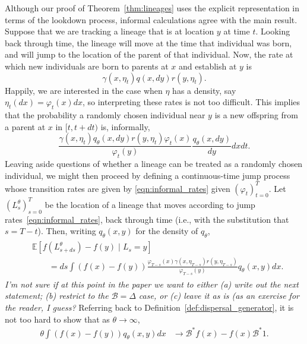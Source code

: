 \documentclass[12pt]{article}
\newcommand{\IE}{\mathbb E}
\newcommand{\DG}{\mathcal{B}}  %
\newcommand{\comment}[1]{{\color{blue} \it #1}}
\begin{document}
Although our proof of Theorem~\ref{thm:lineages}
uses the explicit representation in terms of the lookdown process,
informal calculations agree with the main result.
Suppose that we are tracking a lineage that is at location $y$ at time $t$.
Looking back through time, the lineage will move at the time that individual was born,
and will jump to the location of the parent of that individual.
Now, the rate at which new individuals are born to parents at $x$ and establish at $y$
is
$$
    \gamma(x, \eta_t) q(x, dy) r(y, \eta_t) .
$$
Happily, we are interested in the case when $\eta$ has a density,
say $\eta_t(dx) = \varphi_t(x) dx$,
so interpreting these rates is not too difficult.
This implies that the probability a randomly chosen individual near $y$
is a new offspring from a parent at $x$ in $[t, t+dt)$ is, informally,
\begin{equation} \label{eqn:informal_rates}
\frac{
    \gamma(x, \eta_t) q_\theta(x, dy) r(y, \eta_t) \varphi_t(x)
}{
    \varphi_t(y)
} \frac{ q_\theta(x, dy) }{ dy } dx dt .
\end{equation}
Leaving aside questions of whether a lineage can be treated as a randomly chosen individual,
we might then proceed by defining a continuous-time jump process
whose transition rates are given by \eqref{eqn:informal_rates} given $(\varphi_t)_{t=0}^T$.
Let $(L^\theta_s)_{s=0}^T$ be the location of a lineage that moves according to
jump rates~\eqref{eqn:informal_rates},
back through time (i.e., with the substitution that $s = T-t$).
Then, writing $q_\theta(x, y)$ for the density of $q_\theta$,
\begin{align} \label{eqn:lineage_generator_Edt}
    \begin{split}
    &\IE[f(L^\theta_{s+ds}) - f(y) \;|\; L_s = y]
    \\&\qquad 
    =
    ds \int \left(f(x) - f(y)\right)
    \frac{
        \varphi_{T-s}(x) \gamma(x, \eta_{T-s}) r(y, \eta_{T-s})
    }{
        \varphi_{T-s}(y)
    }
    q_\theta(x, y) dx .
    \end{split}
\end{align}
\comment{I'm not sure if at this point in the paper we want to either
(a) write out the next statement; (b) restrict to the $\DG = \Delta$ case,
or (c) leave it as is (as an exercise for the reader, I guess?}
Referring back to Definition~\ref{def:dispersal_generator},
it is not too hard to show that as $\theta \to \infty$,
\begin{align*}
    \theta \int (f(x) - f(y)) q_\theta(x, y) dx
    &\to
    \DG^* f(x)  - f(x) \DG^* 1 .
\end{align*}
\end{document}
